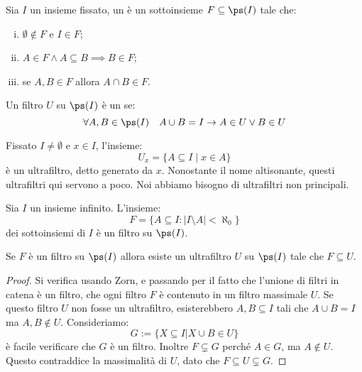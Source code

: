 \begin{definition}
    Sia $I$ un insieme fissato, un  è un sottoinsieme $F \subseteq \ps(I)$ tale che:
    \begin{enumerate}[(i)]
        \item $\emptyset \notin F$ e $I \in F$;
        \item $A \in F \land A \subseteq B \implies B \in F$;
        \item se $A,B \in F$ allora $A \cap B \in F$.
    \end{enumerate}
    Un filtro $U$ su $\ps(I)$ è un  se:
    \[ \forall A,B \in \ps(I) \quad A \cup B = I \to A \in U \lor B \in U
    \]
\end{definition}

\begin{example}
    Fissato $I \ne \emptyset$ e $x \in I$, l'insieme:
    \[ U_x = \{ A \subseteq I \mid x \in A \}
    \]
    è un ultrafiltro, detto  generato da $x$. Nonostante il nome altisonante, questi ultrafiltri qui servono a poco.
    Noi abbiamo bisogno di ultrafiltri non principali.
\end{example}

\begin{example}
    Sia $I$ un insieme infinito. L'insieme:
    \[ F = \{ A \subseteq I : |I \setminus A| < \aleph_0 \}
    \]
    dei sottoinsiemi  di $I$ è un filtro su $\ps(I)$.
\end{example}

\begin{proposition}
    Se $F$ è un filtro su $\ps(I)$ allora esiste un ultrafiltro $U$ su $\ps(I)$ tale che $F \subseteq U$.
\end{proposition}

\begin{proof}
    Si verifica usando Zorn, e passando per il fatto che l'unione di filtri in catena è un filtro, che ogni filtro $F$ è contenuto in un filtro massimale $U$.
    Se questo filtro $U$ non fosse un ultrafiltro, esisterebbero $A,B \subseteq I$ tali che $A \cup B = I$ ma $A, B \notin U$. Consideriamo:
    \[ G := \{ X \subseteq I | X \cup B \in U\}
    \]
    è facile verificare che $G$ è un filtro. Inoltre $F \subsetneq G$ perché $A \in G$, ma $A \notin U$. Questo contraddice la massimalità di $U$, dato che $F \subseteq U \subsetneq G$.
\end{proof}

